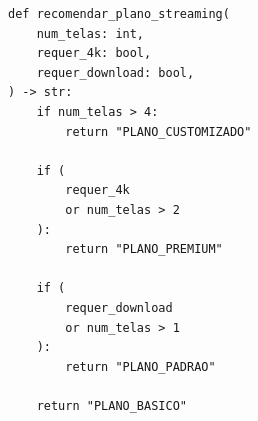 \ifmostrarGabarito
\begin{verbatim}
def recomendar_plano_streaming(
    num_telas: int,
    requer_4k: bool,
    requer_download: bool,
) -> str:
    if num_telas > 4:
        return "PLANO_CUSTOMIZADO"
    
    if (
        requer_4k
        or num_telas > 2
    ):
        return "PLANO_PREMIUM"
    
    if (
        requer_download
        or num_telas > 1
    ):
        return "PLANO_PADRAO"
    
    return "PLANO_BASICO" 
\end{verbatim}

\fi
